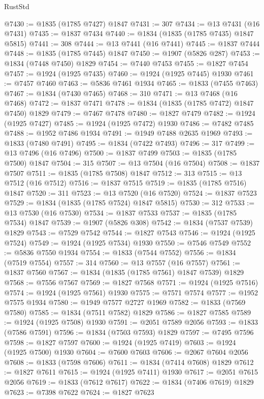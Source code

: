 \begin{lexlean}{RustStd}
\begin{coremodule}
@7430 := @1835 (@1785 @7427) @1847
@7431 := 307
@7434 := @13 @7431 (@16 @7431)
@7435 := @1837 @7434
@7440 := @1834 (@1835 (@1785 @7435) @1847 @5815)
@7441 := 308
@7444 := @13 @7441 (@16 @7441)
@7445 := @1837 @7444
@7448 := @1835 (@1785 @7445) @1847
@7450 := @1907 (@5826 @287)
@7453 := @1834 (@7448 @7450) @1829
@7454 := @7440 @7453
@7455 := @1827 @7454
@7457 := @1924 (@1925 @7435)
@7460 := @1924 (@1925 @7445) @1930
@7461 := @7457 @7460
@7463 := @5836 @7461 @1934
@7465 := @1833 (@7455 @7463)
@7467 := @1834 (@7430 @7465)
@7468 := 310
@7471 := @13 @7468 (@16 @7468)
@7472 := @1837 @7471
@7478 := @1834 (@1835 (@1785 @7472) @1847 @7450) @1829
@7479 := @7467 @7478
@7480 := @1827 @7479
@7482 := @1924 (@1925 @7427)
@7485 := @1924 (@1925 @7472) @1930
@7486 := @7482 @7485
@7488 := @1952 @7486 @1934
@7491 := @1949 @7488 @2635 @1969
@7493 := @1833 (@7480 @7491)
@7495 := @1834 (@7422 @7493)
@7496 := 317
@7499 := @13 @7496 (@16 @7496)
@7500 := @1837 @7499
@7503 := @1835 (@1785 @7500) @1847
@7504 := 315
@7507 := @13 @7504 (@16 @7504)
@7508 := @1837 @7507
@7511 := @1835 (@1785 @7508) @1847
@7512 := 313
@7515 := @13 @7512 (@16 @7512)
@7516 := @1837 @7515
@7519 := @1835 (@1785 @7516) @1847
@7520 := 311
@7523 := @13 @7520 (@16 @7520)
@7524 := @1837 @7523
@7529 := @1834 (@1835 (@1785 @7524) @1847 @5815)
@7530 := 312
@7533 := @13 @7530 (@16 @7530)
@7534 := @1837 @7533
@7537 := @1835 (@1785 @7534) @1847
@7539 := @1907 (@5826 @308)
@7542 := @1834 (@7537 @7539) @1829
@7543 := @7529 @7542
@7544 := @1827 @7543
@7546 := @1924 (@1925 @7524)
@7549 := @1924 (@1925 @7534) @1930
@7550 := @7546 @7549
@7552 := @5836 @7550 @1934
@7554 := @1833 (@7544 @7552)
@7556 := @1834 (@7519 @7554)
@7557 := 314
@7560 := @13 @7557 (@16 @7557)
@7561 := @1837 @7560
@7567 := @1834 (@1835 (@1785 @7561) @1847 @7539) @1829
@7568 := @7556 @7567
@7569 := @1827 @7568
@7571 := @1924 (@1925 @7516)
@7574 := @1924 (@1925 @7561) @1930
@7575 := @7571 @7574
@7577 := @1952 @7575 @1934
@7580 := @1949 @7577 @2727 @1969
@7582 := @1833 (@7569 @7580)
@7585 := @1834 (@7511 @7582) @1829
@7586 := @1827 @7585
@7589 := @1924 (@1925 @7508) @1930
@7591 := @2051 @7589 @2056
@7593 := @1833 (@7586 @7591)
@7596 := @1834 (@7503 @7593) @1829
@7597 := @7495 @7596
@7598 := @1827 @7597
@7600 := @1924 (@1925 @7419)
@7603 := @1924 (@1925 @7500) @1930
@7604 := @7600 @7603
@7606 := @2067 @7604 @2056
@7608 := @1833 (@7598 @7606)
@7611 := @1834 (@7414 @7608) @1829
@7612 := @1827 @7611
@7615 := @1924 (@1925 @7411) @1930
@7617 := @2051 @7615 @2056
@7619 := @1833 (@7612 @7617)
@7622 := @1834 (@7406 @7619) @1829
@7623 := @7398 @7622
@7624 := @1827 @7623

\end{coremodule}
\end{lexlean}
